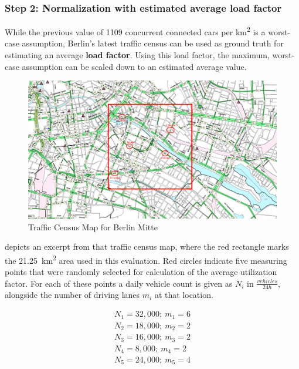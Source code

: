 \subsubsection{Step 2: Normalization with estimated average load factor}
While the previous value of 1109 concurrent connected cars per \si{\square\kilo\meter} is a worst-case assumption, Berlin's latest traffic census \cite{VerkehrslenkungBerlinVLB2014} can be used as ground truth for estimating an average \textbf{load factor}. Using this load factor, the maximum, worst-case assumption can be scaled down to an estimated average value. 

\begin{figure}[H]
	\centering
	\includegraphics[width=1.0\linewidth]{98_images/berlin_traffic_map_2}
	\caption[Traffic Census Map for Berlin Mitte]{Traffic Census Map for Berlin Mitte \cite{VerkehrslenkungBerlinVLB2014}}
	\label{fig:berlin_traffic_map}
\end{figure}

 depicts an excerpt from that traffic census map, where the red rectangle marks the \SI{21.25}{\square\km} area used in this evaluation. Red circles indicate five measuring points that were randomly selected for calculation of the average utilization factor. For each of these points a daily vehicle count is given as $N_{i}$ in $\frac{vehicles}{24 h}$, alongside the number of driving lanes $m_i$ at that location.

\begin{gather*}
N_1 = 32,000; \  m_1 = 6 \\
N_2 = 18,000; \  m_2 = 2 \\
N_3 = 16,000; \  m_3 = 2 \\
N_4 = 8,000; \  m_4 = 2 \\
N_5 = 24,000; \  m_5 = 4
\end{gather*}

